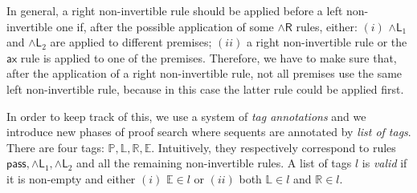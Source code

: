 \documentclass[submission,copyright,creativecommons]{eptcs}
\theoremstyle{definition}
\newtheorem{defn}{Definition}[section]
\newcommand{\tr}{\otimes \mathsf{R}}
\newcommand{\pass}{\mathsf{pass}}
\newcommand{\unitr}{\mathsf{IR}}
\newcommand{\andlone}{\land \mathsf{L}_{1}}
\newcommand{\andltwo}{\land \mathsf{L}_{2}}
\newcommand{\andli}{\land \mathsf{L}_{i}}
\newcommand{\andr}{\land \mathsf{R}}
\newcommand{\ax}{\mathsf{ax}}
\newcommand{\Pass}{\mathsf{P}}
\newcommand{\F}{\mathsf{F}}
\newcommand{\tP}{\mathbb{P}}
\newcommand{\tL}{\mathbb{L}}
\newcommand{\tR}{\mathbb{R}}
\newcommand{\tE}{\mathbb{E}}
\newcommand\niccolo[1]{\mbox{}
{\marginpar{\color{red}NV}}
{\sf\noindent\color{red}#1}}%
\begin{document}
In general, a right non-invertible rule should be applied  before a left non-invertible one if, after the possible application of some $\andr$ rules, either:
$(i)$ $\andlone$ and $\andltwo$ are applied to different premises;
$(ii)$ a right non-invertible rule or the $\ax$ rule is applied to one of the premises.
Therefore, we have to make sure that, after the application of a right non-invertible rule, not all premises use the same left non-invertible rule, because in this case the latter rule could be applied first.

In order to keep track of this,
we use a system of \emph{tag annotations} and we introduce new phases of proof search where sequents are annotated by \emph{list of tags}. 
There are four tags: $\tP , \tL , \tR , \tE$. Intuitively, they respectively correspond to rules $\pass , \andlone , \andltwo$ and all the remaining non-invertible rules.
A list of tags $l$ is \emph{valid} if it is non-empty and either $(i)$ $\tE \in l$ or $(ii)$ both $\tL \in l$ and $\tR \in l$.
\end{document}
